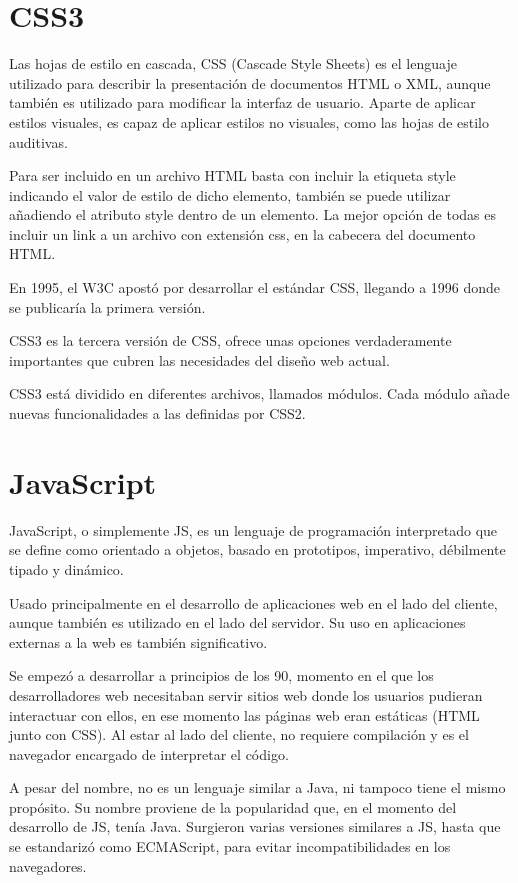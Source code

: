 \section{CSS3} 
\label{sec:css3}


Las hojas de estilo en cascada, CSS (Cascade Style Sheets) es el lenguaje utilizado para describir la presentación de documentos HTML o XML, aunque también es utilizado para modificar la interfaz de usuario. Aparte de aplicar estilos visuales, es capaz de aplicar estilos no visuales, como las hojas de estilo auditivas. 


Para ser incluido en un archivo HTML basta con incluir la etiqueta style indicando el valor de estilo de dicho elemento, también se puede utilizar añadiendo el atributo style dentro de un elemento. La mejor opción de todas es incluir un link a un archivo con extensión css, en la cabecera del documento HTML.


En 1995, el W3C apostó por desarrollar el estándar CSS, llegando a 1996 donde se publicaría la primera versión. 


CSS3 es la tercera versión de CSS, ofrece unas opciones verdaderamente importantes que cubren las necesidades del diseño web actual.


CSS3 está dividido en diferentes archivos, llamados módulos. Cada módulo añade nuevas funcionalidades a las definidas por CSS2. 

\section{JavaScript} 
\label{sec:javascript}


JavaScript, o simplemente JS, es un lenguaje de programación interpretado que se define como orientado a objetos, basado en prototipos, imperativo, débilmente tipado y dinámico. 


Usado principalmente en el desarrollo de aplicaciones web en el lado del cliente, aunque también es utilizado en el lado del servidor. Su uso en aplicaciones externas a la web es también significativo.


Se empezó a desarrollar a principios de los 90, momento en el que los desarrolladores web necesitaban servir sitios web donde los usuarios pudieran interactuar con ellos, en ese momento las páginas web eran estáticas (HTML junto con CSS). Al estar al lado del cliente, no requiere compilación y es el navegador encargado de interpretar el código.


A pesar del nombre, no es un lenguaje similar a Java, ni tampoco tiene el mismo propósito. Su nombre proviene de la popularidad que, en el momento del desarrollo de JS, tenía Java. Surgieron varias versiones similares a JS, hasta que se estandarizó como ECMAScript, para evitar incompatibilidades en los navegadores.


